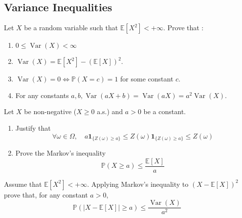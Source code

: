 \begin{center}
    \section*{Variance Inequalities}
\end{center}

\begin{Exercise}
    Let $X$ be a random variable such that $\mathbb{E}\left[X^2\right]<+\infty$. Prove that :
    \begin{enumerate}
        \item $0 \leq \operatorname{Var}(X)<\infty$
        \item $\operatorname{Var}(X)=\mathbb{E}\left[X^2\right]-(\mathbb{E}[X])^2$.
        \item $\operatorname{Var}(X)=0 \Longleftrightarrow \mathbb{P}(X=c)=1$ for some constant $c$.
        \item For any constants $a, b, \operatorname{Var}(a X+b)=\operatorname{Var}(a X)=a^2 \operatorname{Var}(X)$.
    \end{enumerate}
\end{Exercise}

\begin{Exercise}
    Let $X$ be non-negative ($X \geq 0$ a.s.) and $a>0$ be a constant.
    \begin{enumerate}
        \item Justify that
              $$\forall \omega \in \Omega, \quad a \mathbf{1}_{\{Z(\omega) \geqslant a\}} \leqslant Z(\omega) \mathbf{1}_{\{Z(\omega) \geqslant a\}} \leqslant Z(\omega)$$
        \item Prove the Markov's inequality
              $$
                  \mathbb{P}(X \geq a) \leq \frac{\mathbb{E}[X]}{a}
              $$
    \end{enumerate}
\end{Exercise}

\begin{Exercise}
    Assume that $\mathbb{E}\left[X^2\right]<+\infty$. Applying Markov's inequality to $(X-\mathbb{E}[X])^2$ prove that, for any constant $a>0$,
    $$
        \mathbb{P}(|X-\mathbb{E}[X]| \geq a) \leq \frac{\operatorname{Var}(X)}{a^2}
    $$
\end{Exercise}